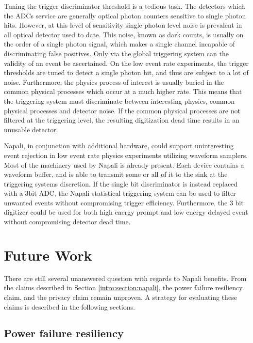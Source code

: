 Tuning the trigger discriminator threshold is a tedious task.
The detectors which the ADCs service are generally optical photon counters sensitive to single photon hits.
However, at this level of sensitivity single photon level noise is prevalent in all optical detector used to date.
This noise, known as dark counts, is usually on the order of a single photon signal, which makes a single channel incapable of discriminating false positives.
Only via the global triggering system can the validity of an event be ascertained.
On the low event rate experiments, the trigger thresholds are tuned to detect a single photon hit, and thus are subject to a lot of noise.\cite{li2016invited}
Furthermore, the physics process of interest is usually buried in the common physical processes which occur at a much higher rate.
This means that the triggering system must discriminate between interesting physics, common physical processes and detector noise.
If the common physical processes are not filtered at the triggering level, the resulting digitization dead time results in an unusable detector.

Napali, in conjunction with additional hardware, could support uninteresting event rejection in low event rate physics experiments utilizing waveform samplers.
Most of the machinery used by Napali is already present.
Each device contains a waveform buffer, and is able to transmit some or all of it to the sink at the triggering systems discretion.
If the single bit discriminator is instead replaced with a 3bit ADC, the Napali statistical triggering system can be used to filter unwanted events without compromising trigger efficiency.
Furthermore, the 3 bit digitizer could be used for both high energy prompt and low energy delayed event without compromising detector dead time.


\section{Future Work}\label{sec:future-work}

There are still several unanswered question with regards to Napali benefits.
From the claims described in Section \ref{intro:section:napali}, the power failure resiliency claim, and the privacy claim remain unproven.
A strategy for evaluating these claims is described in the following sections.

\subsection{Power failure resiliency}\label{subsec:power-failure-resiliancy}

